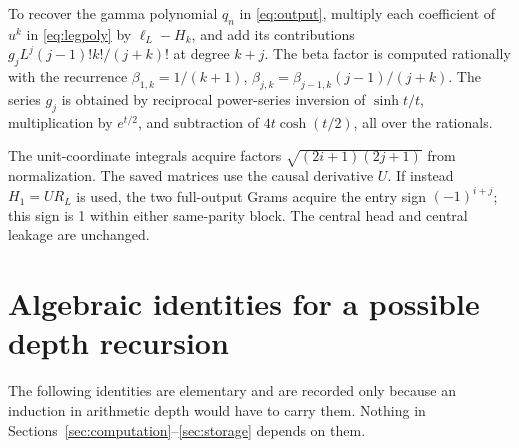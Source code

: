 \documentclass[11pt]{article}
\numberwithin{equation}{section}
\theoremstyle{definition}
\theoremstyle{remark}
\begin{document}
To recover the gamma polynomial $q_n$ in \eqref{eq:output}, multiply each
coefficient of $u^k$ in \eqref{eq:legpoly} by $\ell_L-H_k$, and add
its contributions $g_jL^j(j-1)!k!/(j+k)!$ at degree $k+j$.
The beta factor is computed rationally with the recurrence
$\beta_{1,k}=1/(k+1)$,
$\beta_{j,k}=\beta_{j-1,k}(j-1)/(j+k)$.
The series $g_j$ is obtained by reciprocal power-series inversion of
$\sinh t/t$, multiplication by $e^{t/2}$, and subtraction of
$4t\cosh(t/2)$, all over the rationals.

The unit-coordinate integrals acquire factors $\sqrt{(2i+1)(2j+1)}$ from
normalization. The saved matrices use the causal derivative $U$.
If instead $H_1=UR_L$ is used, the two full-output Grams acquire the
entry sign $(-1)^{i+j}$; this sign is 1 within either same-parity block.
The central head and central leakage are unchanged.

\section{Algebraic identities for a possible depth recursion}\label{app:recursion}

The following identities are elementary and are recorded only because an
induction in arithmetic depth would have to carry them. Nothing in
Sections~\ref{sec:computation}--\ref{sec:storage} depends on them.
\end{document}
